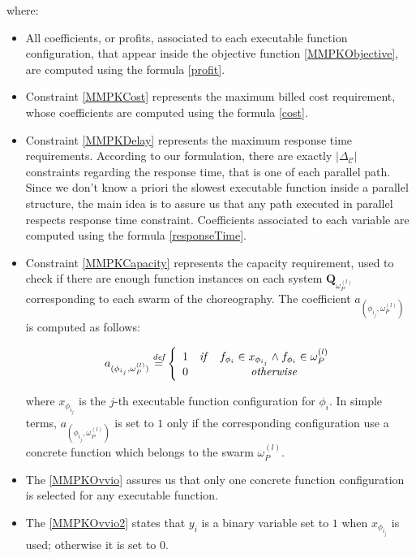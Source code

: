 \documentclass[12pt,a4paper]{report}
\newcommand{\mathDef}{\overset{\textit{def}}{=}}
\begin{document}
where:

\begin{itemize}
	\item All coefficients, or profits, associated to each executable function configuration, that appear inside the objective function \ref{MMPKObjective}, are computed using the formula \ref{profit}.
	
	\item Constraint \ref{MMPKCost} represents the maximum billed cost requirement, whose coefficients are computed using the formula \ref{cost}. 
	
    \item Constraint \ref{MMPKDelay} represents the maximum response time requirements. According to our formulation, there are exactly $|\Delta_{\mathcal{C}}|$ constraints regarding the response time, that is one of each parallel path. Since we don't know a priori the slowest executable function inside a parallel structure, the main idea is to assure us that any path executed in parallel respects response time constraint. Coefficients associated to each variable are computed using the formula \ref{responseTime}.
    
    \item Constraint \ref{MMPKCapacity} represents the capacity requirement, used to check if there are enough function instances on each system $\textbf{Q}_{\omega_{P}^{(l)}}$ corresponding to each swarm of the choreography. The coefficient $a_{(\phi_{i_{j}},\omega_{P}^{(l)})}$ is computed as follows:
    
    \begin{equation}	
    	a_{(\phi_{i_{j}},\omega_{P}^{(l)})} \mathDef \left\{
    	\begin{array}{lcc}
    		1 & \text{\textit{if}} & f_{\phi_i} \in x_{\phi_{i_j}} \wedge f_{\phi_i} \in \omega_{P}^{(l)} \\ 
    		0 & & \text{\textit{otherwise}} \\
    	\end{array} \right.
    \end{equation}
    
	where $x_{\phi_{i_j}}$ is the $j$-th executable function configuration for $\phi_i$. In simple terms, $a_{(\phi_{i_{j}},\omega_{P}^{(l)})}$ is set to $1$ only if the corresponding configuration use a concrete function which belongs to the swarm $\omega_{P}^{(l)}$.
	
	\item The \ref{MMPKOvvio} assures us that only one concrete function configuration is selected for any executable function. 
	
	\item The \ref{MMPKOvvio2} states that $y_i$ is a binary variable set to $1$ when $x_{\phi_{i_j}}$ is used; otherwise it is set to $0$.
	
\end{itemize}
\end{document}
